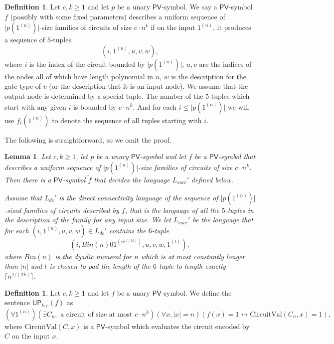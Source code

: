 \documentclass[11pt]{article}
\newcommand{\PV}{\mathsf{PV}}
\newcommand{\UP}{\mathsf{UP}}
\newcommand{\CircuitVal}{\text{CircuitVal}}
\newcommand{\abs}[1]{\lvert #1 \rvert}
\newcommand{\ceil}[1]{\lceil #1 \rceil}
\newtheorem{lemma}[theorem]{Lemma}
\theoremstyle{definition}
\theoremstyle{definition}
\newtheorem{definition}[theorem]{Definition}
\theoremstyle{remark}
\begin{document}
\begin{definition}
Let $c,k\geq 1$ and let $p$ be a unary $\PV$-symbol. We say a $\PV$-symbol $f$ (possibly with some fixed parameters) describes a uniform sequence of $\abs{p(1^{(n)})}$-size families of circuits of size $c\cdot n^k$ if on the input $1^{(n)}$, it produces a sequence of $5$-tuples 
\[(i,1^{(n)},u,v,w),\]
where $i$ is the index of the circuit bounded by $\abs{p(1^{(n)})}$, $u,v$ are the indices of the nodes all of which have length polynomial in $n$, $w$ is the description for the gate type of $v$ (or the description that it is an input node). We assume that the output node is determined by a special tuple. The number of the $5$-tuples which start with any given $i$ is bounded by $c\cdot n^k$. And for each $i\leq \abs{p(1^{(n)})}$ we will use $f_i(1^{(n)})$ to denote the sequence of all tuples starting with $i$.
\end{definition}

The following is straightforward, so we omit the proof.

\begin{lemma}\label{lemmasuccrep}
    Let $c,k\geq 1$, let $p$ be a unary $\PV$-symbol and let $f$ be a $\PV$-symbol that describes a uniform sequence of $\abs{p(1^{(n)})}$-size families of circuits of size $c\cdot n^k$. Then there is a $\PV$-symbol $\tilde f$ that decides the language $L_{succ}'$ defined below.

    Assume that $L_{dc}'$ is the direct connectivity language of the sequence of $\abs{p(1^{(n)})}$-sized families of circuits described by $f$, that is the language of all the $5$-tuples in the description of the family for any input size. We let $L_{succ}'$ be the language that for each $(i,1^{(n)},u,v,w)\in L_{dc}'$ contains the $6$-tuple
    \[(i,Bin(n)01^{(n^{1/(3k)})},u,v,w,1^{(t)}),\]
    where $Bin(n)$ is the dyadic numeral for $n$ which is at most constantly longer than $\abs{n}$ and $t$ is chosen to pad the length of the $6$-tuple to length exactly $\ceil{n^{1/(2k)}}$.
\end{lemma}

\begin{definition}\label{definitionup}
    Let $c,k\geq 1$ and let $f$ be a unary $\PV$-symbol. We define the sentence $\UP_{k,c}(f)$ as
    \[(\forall 1^{(n)})(\exists C_n,\text{ a circuit of size at most $c\cdot n^k$})(\forall x,\abs{x}=n)(f(x)=1\leftrightarrow \CircuitVal(C_n,x)=1),\]
    where $\CircuitVal(C,x)$ is a $\PV$-symbol which evaluates the circuit encoded by $C$ on the input $x$.
\end{definition}
\end{document}
